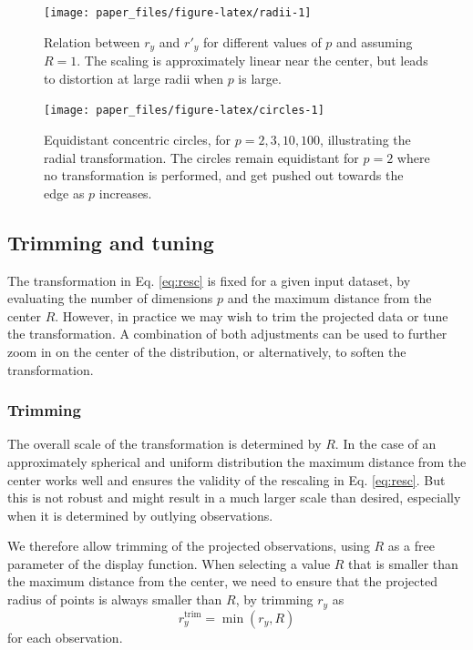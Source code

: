 \documentclass[]{interact}
\theoremstyle{plain}%
\theoremstyle{definition}
\theoremstyle{remark}
\begin{document}
\begin{figure}

{\centering \texttt{[image: paper\_files/figure-latex/radii-1]} 

}

\caption{Relation between $r_y$ and $r'_y$ for different values of $p$ and assuming $R=1$. The scaling is approximately linear near the center, but leads to distortion at large radii when $p$ is large.}\label{fig:radii}
\end{figure}

\begin{figure}

{\centering \texttt{[image: paper\_files/figure-latex/circles-1]} 

}

\caption{Equidistant concentric circles, for $p=2, 3, 10, 100$, illustrating the radial transformation. The circles remain equidistant for $p=2$ where no transformation is performed, and get pushed out towards the edge as $p$ increases.}\label{fig:circles}
\end{figure}

\hypertarget{sec:params}{%
\subsection{Trimming and tuning}\label{sec:params}}

The transformation in Eq. \ref{eq:resc} is fixed for a given input
dataset, by evaluating the number of dimensions \(p\) and the maximum
distance from the center \(R\). However, in practice we may wish to trim
the projected data or tune the transformation. A combination of both
adjustments can be used to further zoom in on the center of the
distribution, or alternatively, to soften the transformation.

\hypertarget{trimming}{%
\subsubsection{Trimming}\label{trimming}}

The overall scale of the transformation is determined by \(R\). In the
case of an approximately spherical and uniform distribution the maximum
distance from the center works well and ensures the validity of the
rescaling in Eq. \ref{eq:resc}. But this is not robust and might result
in a much larger scale than desired, especially when it is determined by
outlying observations.

We therefore allow trimming of the projected observations, using \(R\)
as a free parameter of the display function. When selecting a value
\(R\) that is smaller than the maximum distance from the center, we need
to ensure that the projected radius of points is always smaller than
\(R\), by trimming \(r_y\) as \begin{equation}
r_y^{\mathrm{trim}} = \min(r_y, R)
\label{eq:cutR}
\end{equation} for each observation.
\end{document}
